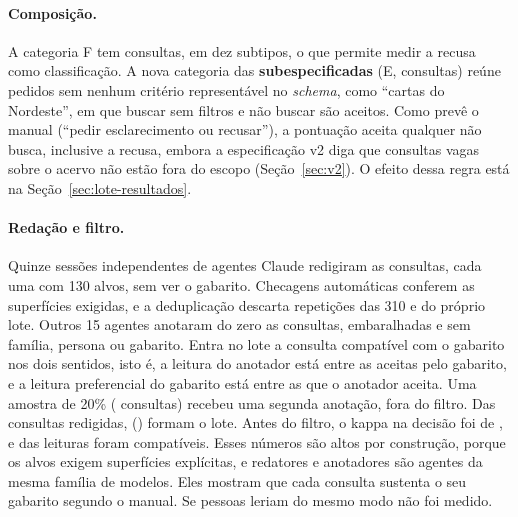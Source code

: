 \paragraph{Composição.} A categoria F tem  consultas, em dez subtipos, o que permite medir a recusa como classificação. A nova categoria das \textbf{subespecificadas} (E,  consultas) reúne pedidos sem nenhum critério representável no \textit{schema}, como ``cartas do Nordeste'', em que buscar sem filtros e não buscar são aceitos. Como prevê o manual (``pedir esclarecimento ou recusar''), a pontuação aceita qualquer não busca, inclusive a recusa, embora a especificação v2 diga que consultas vagas sobre o acervo não estão fora do escopo (Seção~\ref{sec:v2}). O efeito dessa regra está na Seção~\ref{sec:lote-resultados}.

\paragraph{Redação e filtro.} Quinze sessões independentes de agentes Claude redigiram as consultas, cada uma com 130 alvos, sem ver o gabarito. Checagens automáticas conferem as superfícies exigidas, e a deduplicação descarta repetições das 310 e do próprio lote. Outros 15 agentes anotaram do zero as consultas, embaralhadas e sem família, persona ou gabarito. Entra no lote a consulta compatível com o gabarito nos dois sentidos, isto é, a leitura do anotador está entre as aceitas pelo gabarito, e a leitura preferencial do gabarito está entre as que o anotador aceita. Uma amostra de 20\% ( consultas) recebeu uma segunda anotação, fora do filtro. Das  consultas redigidas,  () formam o lote. Antes do filtro, o kappa na decisão foi de , e  das leituras foram compatíveis. Esses números são altos por construção, porque os alvos exigem superfícies explícitas, e redatores e anotadores são agentes da mesma família de modelos. Eles mostram que cada consulta sustenta o seu gabarito segundo o manual. Se pessoas leriam do mesmo modo não foi medido.


